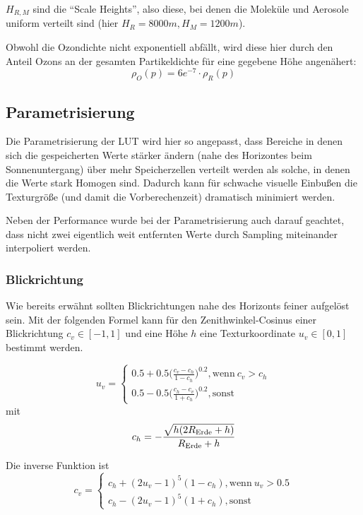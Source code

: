 $H_{R,M}$ sind die \enquote{Scale Heights}, also diese, bei denen die Moleküle und Aerosole uniform verteilt sind (hier
$H_R=8000m, H_M=1200m$).

Obwohl die Ozondichte nicht exponentiell abfällt, wird diese hier durch den Anteil Ozons an der gesamten Partikeldichte
für eine gegebene Höhe angenähert:
\begin{equation*}
	\rho_O(p) = 6e^{-7} \cdot \rho_R(p)
\end{equation*}

\subsection{Parametrisierung} \label{ssec:params}
Die Parametrisierung der LUT wird hier so angepasst, dass Bereiche in denen sich die gespeicherten Werte stärker ändern 
(nahe des Horizontes beim Sonnenuntergang) über mehr Speicherzellen verteilt werden als solche, in denen die Werte stark
Homogen sind. Dadurch kann für schwache visuelle Einbußen die Texturgröße (und damit die Vorberechenzeit) dramatisch
minimiert werden.

Neben der Performance wurde bei der Parametrisierung auch darauf geachtet, dass nicht zwei eigentlich weit entfernten
Werte durch Sampling miteinander interpoliert werden.

\subsubsection{Blickrichtung}
Wie bereits erwähnt sollten Blickrichtungen nahe des Horizonts feiner aufgelöst sein. Mit der folgenden Formel kann für
den Zenithwinkel-Cosinus einer Blickrichtung $c_v \in [-1, 1]$ und eine Höhe $h$ eine Texturkoordinate $u_v \in [0,1]$
bestimmt werden.

\begin{equation*}
	u_v = \begin{cases}
		0.5 + 0.5 \Big(\frac{c_v-c_h}{1-c_h}\Big)^{0.2}, \text{wenn}\  c_v > c_h \\
		0.5 - 0.5 \Big(\frac{c_h-c_v}{1+c_h}\Big)^{0.2}, \text{sonst}
	\end{cases}
\end{equation*}
mit
\begin{equation*}
	c_h = -\frac{\sqrt{h(2R_{\text{Erde}}+h)}}{R_{\text{Erde}}+h}\\
\end{equation*}

Die inverse Funktion ist
\begin{equation*}
	c_v = \begin{cases}
		c_h+(2u_v-1)^5(1-c_h), \text{wenn}\  u_v > 0.5 \\
		c_h-(2u_v-1)^5(1+c_h), \text{sonst}
	\end{cases}
\end{equation*}

